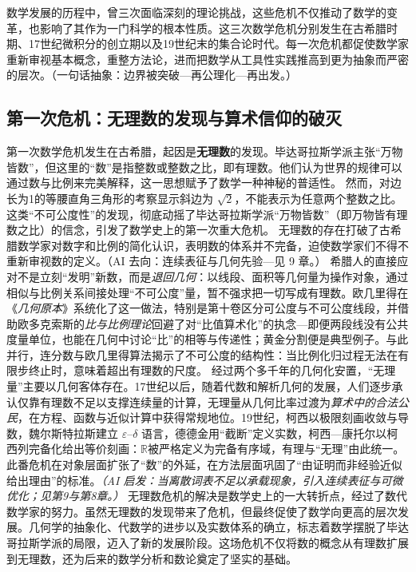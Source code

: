 
数学发展的历程中，曾三次面临深刻的理论挑战，这些危机不仅推动了数学的变革，也影响了其作为一门科学的根本性质。这三次数学危机分别发生在古希腊时期、17世纪微积分的创立期以及19世纪末的集合论时代。每一次危机都促使数学家重新审视基本概念，重整方法论，进而把数学从工具性实践推高到更为抽象而严密的层次。{（一句话抽象：边界被突破—再公理化—再出发。）}
\subsection{第一次危机：无理数的发现与算术信仰的破灭}


第一次数学危机发生在古希腊，起因是{\bf 无理数}的发现。毕达哥拉斯学派主张“万物皆数”，但这里的“数”是指整数或整数之比，即有理数。他们认为世界的规律可以通过数与比例来完美解释，这一思想赋予了数学一种神秘的普适性。
然而，对边长为1的等腰直角三角形的考察显示斜边为 $\sqrt{2}$，不能表示为任意两个整数之比。这类“不可公度性”的发现，彻底动摇了毕达哥拉斯学派“万物皆数”（即万物皆有理数之比）的信念，引发了数学史上的第一次重大危机。
无理数的存在打破了古希腊数学家对数字和比例的简化认识，表明数的体系并不完备，迫使数学家们不得不重新审视数的定义。{（AI 去向：连续表征与几何先验—见 9 章。）}
希腊人的直接应对不是立刻“发明”新数，而是{\itshape 退回几何}：以线段、面积等几何量为操作对象，通过相似与比例关系间接处理“不可公度”量，暂不强求把一切写成有理数。欧几里得在《\emph{几何原本}》系统化了这一做法，特别是第十卷区分可公度与不可公度线段，并借助欧多克索斯的{\itshape 比与比例理论}回避了对“比值算术化”的执念---即便两段线没有公共度量单位，也能在几何中讨论“比”的相等与传递性；黄金分割便是典型例子。与此并行，连分数与欧几里得算法揭示了不可公度的结构性：当比例化归过程无法在有限步终止时，意味着超出有理数的尺度。
经过两个多千年的几何化安置，“无理量”主要以几何客体存在。17世纪以后，随着代数和解析几何的发展，人们逐步承认仅靠有理数不足以支撑连续量的计算，无理量从几何比率过渡为{\itshape 算术中的合法公民}，在方程、函数与近似计算中获得常规地位。19世纪，柯西以极限刻画收敛与导数，魏尔斯特拉斯建立 $\varepsilon$–$\delta$ 语言，德德金用“截断”定义实数，柯西—康托尔以柯西列完备化给出等价刻画：$\mathbb{R}$被严格定义为完备有序域，有理与“无理”由此统一。此番危机在对象层面扩张了“数”的外延，在方法层面巩固了“由证明而非经验近似给出理由”的标准。{\itshape（AI 启发：当离散词表不足以承载现象，引入连续表征与可微优化；见第9与第8章。）}
无理数危机的解决是数学史上的一大转折点，经过了数代数学家的努力。虽然无理数的发现带来了危机，但最终促使了数学向更高的层次发展。几何学的抽象化、代数学的进步以及实数体系的确立，标志着数学摆脱了毕达哥拉斯学派的局限，迈入了新的发展阶段。这场危机不仅将数的概念从有理数扩展到无理数，还为后来的数学分析和数论奠定了坚实的基础。

